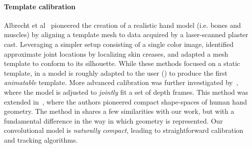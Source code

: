 \paragraph{Template calibration}
Albrecht et al~ pioneered the creation of a realistic hand model (i.e. bones and muscles) by aligning a template mesh to data acquired by a laser-scanned plaster cast. Leveraging a simpler setup consisting of a single color image, \cite{rhee2006hand} identified approximate joint locations by localizing skin creases, and adapted a mesh template to conform to its silhouette. While these methods focused on a static template, in \cite{delagorce2011model} a model is roughly adapted to the user () to produce the first \emph{animatable} template. More advanced calibration was further investigated by~\cite{taylor2014user}, where the model is adjusted to \emph{jointly} fit a set of depth frames. This method was extended in~\cite{khamis15learning}, where the authors pioneered compact   shape-spaces of human hand geometry.
% 
The method in \cite{taylor2014user} shares a few similarities with our work, but with a fundamental difference in the way in which geometry is represented. Our convolutional model is \emph{naturally compact}, leading to straightforward calibration and tracking algorithms. 

